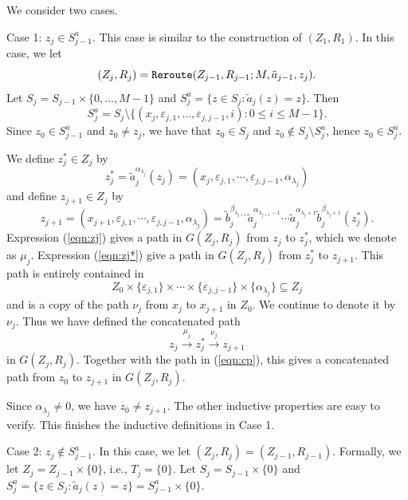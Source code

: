 \documentclass[10pt,a4paper]{amsart}
\theoremstyle{definition}
\theoremstyle{definition}
\numberwithin{equation}{section}
\begin{document}
We consider two cases.

Case 1: $z_j\in S_{j-1}^a$. This case is similar to the construction of $(Z_1, R_1)$. In this case, we let
$$ (Z_j, R_j)=\mbox{\tt Reroute}(Z_{j-1}, R_{j-1}; M, \tilde{a}_{j-1}, z_j). $$
Let $S_j=S_{j-1}\times\{0, \dots, M-1\}$ and $S_j^a=\{z\in S_j\colon \tilde{a}_j(z)=z\}$. Then
$$ S_j^a=S_j\setminus \{(x_j, \varepsilon_{j,1}, \dots, \varepsilon_{j,j-1}, i)\colon 0\leq i\leq M-1\}. $$
Since $z_0\in S_{j-1}^a$ and $z_0\neq z_j$, we have that $z_0\in S_j$ and $z_0\not\in S_j\setminus S_j^a$, hence $z_0\in S_j^a$.

We define $z_j^*\in Z_j$ by
\begin{equation}\label{eqn:zj} z_j^*=\tilde{a}_j^{\alpha_{\lambda_j}}(z_j)=(x_j, \varepsilon_{j,1}, \cdots, \varepsilon_{j, j-1}, \alpha_{\lambda_j}) \end{equation}
and define $z_{j+1}\in Z_{j}$ by
\begin{equation}\label{eqn:zj*} z_{j+1}=(x_{j+1}, \varepsilon_{j,1}, \cdots, \varepsilon_{j,j-1}, \alpha_{\lambda_j})=\tilde{b}_j^{\beta_{\lambda_{j+1}}}\tilde{a}_j^{\alpha_{\lambda_{j+1}-1}}\cdots\tilde{a}_j^{\alpha_{\lambda_{j}+1}}\tilde{b}_j^{\beta_{\lambda_{j}+1}}(z_j^*). \end{equation}
Expression (\ref{eqn:zj}) gives a path in $G(Z_j, R_j)$ from $z_j$ to $z_j^*$, which we denote as $\mu_j$. Expression (\ref{eqn:zj*}) give a path in $G(Z_j, R_j)$ from $z_j^*$ to $z_{j+1}$. This path is entirely contained in 
$$Z_0\times  \{\varepsilon_{j,1}\}\times \cdots\times\{ \varepsilon_{j,j-1}\}\times\{\alpha_{\lambda_j}\}\subseteq Z_{j}$$
and is a copy of the path $\nu_j$ from $x_j$ to $x_{j+1}$ in $Z_0$. We continue to denote it by $\nu_j$. Thus we have defined the concatenated path
$$ z_j\stackrel{\mu_j}{\longrightarrow} z_j^*\stackrel{\nu_j}{\longrightarrow} z_{j+1} $$
in $G(Z_j, R_j)$. Together with the path in (\ref{eqn:cp}), this gives a concatenated path from $z_0$ to $z_{j+1}$ in $G(Z_j, R_j)$. 

Since $\alpha_{\lambda_j}\neq 0$, we have $z_0\neq z_{j+1}$. The other inductive properties are easy to verify. This finishes the inductive definitions in Case 1.









Case 2: $z_j\not\in S_{j-1}^a$. In this case, we let $(Z_j, R_j)=(Z_{j-1}, R_{j-1})$. Formally, we let $Z_j=Z_{j-1}\times\{0\}$, i.e., $T_j=\{0\}$. Let $S_j=S_{j-1}\times \{0\}$ and $S_j^a=\{z\in S_j\colon \tilde{a}_j(z)=z\}=S_{j-1}^a\times\{0\}$.
\end{document}

